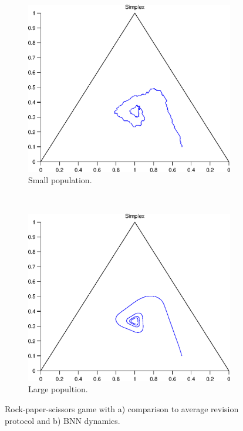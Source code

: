 \documentclass[a4paper,10pt]{article}
\begin{document}
\begin{figure}[th]
  \centering
  \begin{subfigure}[b]{0.4\textwidth}
	  \includegraphics[width=\textwidth]{./images/test_finite_comparison2average.eps}
	  \caption{Small population.}
	  \label{fig:finite2_protocol}
  \end{subfigure}
  ~ 
  \begin{subfigure}[b]{0.4\textwidth}
	  \includegraphics[width=\textwidth]{./images/test1_simplex_bnn.eps}
	  \caption{Large popultion.}
	  \label{fig:finite2_dynamics}
  \end{subfigure}
  \caption{Rock-paper-scissors game with a) comparison to average revision protocol and b) BNN dynamics.}
  \label{fig:finite2}
\end{figure}
\end{document}
